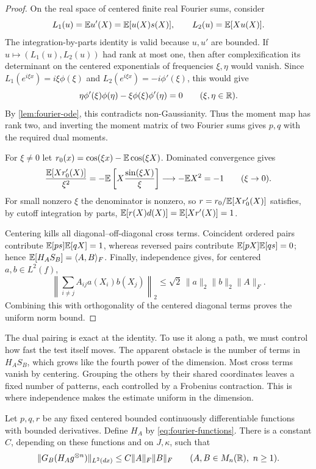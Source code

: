 \begin{proof}
On the real space of centered finite real Fourier sums, consider
\[
 L_1(u)=\mathbb E u'(X)=\mathbb E[u(X)s(X)],
 \qquad L_2(u)=\mathbb E[Xu(X)].
\]
The integration-by-parts identity is valid because $u,u'$ are bounded.  If
$u\mapsto(L_1(u),L_2(u))$ had rank at most one, then after complexification
its determinant on the centered exponentials of frequencies $\xi,\eta$
would vanish.  Since
$L_1(e^{i\xi x})=i\xi\phi(\xi)$ and
$L_2(e^{i\xi x})=-i\phi'(\xi)$, this would give
\[
 \eta\phi'(\xi)\phi(\eta)
       -\xi\phi(\xi)\phi'(\eta)=0
 \qquad(\xi,\eta\in\mathbb R).
\]
By \cref{lem:fourier-ode}, this contradicts non-Gaussianity.  Thus the moment
map has rank two, and inverting the moment matrix of two Fourier sums gives
$p,q$ with the required dual moments.

For $\xi\ne0$ let
$r_0(x)=\cos(\xi x)-\mathbb E\cos(\xi X)$.  Dominated convergence
gives
\[
 \frac{\mathbb E[Xr_0'(X)]}{\xi^2}
 =-\mathbb E\left[X\frac{\sin(\xi X)}\xi\right]
 \longrightarrow-\mathbb E X^2=-1
 \qquad(\xi\to0).
\]
For small nonzero $\xi$ the denominator is nonzero, so
$r=r_0/\mathbb E[Xr_0'(X)]$ satisfies, by cutoff integration by parts,
$\mathbb E[r(X)d(X)]=\mathbb E[Xr'(X)]=1$.

Centering kills all diagonal--off-diagonal cross terms.  Coincident ordered
pairs contribute $\mathbb E[ps]\mathbb E[qX]=1$, whereas reversed pairs contribute
$\mathbb E[pX]\mathbb E[qs]=0$; hence $\mathbb E[H_AS_B]=\langle A,B\rangle_F$.
Finally, independence gives, for centered $a,b\in L^2(f)$,
\begin{equation}
 \left\|\sum_{i\ne j}A_{ij}a(X_i)b(X_j)\right\|_2
 \le\sqrt2\,\|a\|_2\|b\|_2\|A\|_F.
\end{equation}
Combining this with orthogonality of the centered diagonal terms proves the
uniform norm bound.
\end{proof}

The dual pairing is exact at the identity. To use it along a path, we must
control how fast the test itself moves. The apparent obstacle is the number
of terms in \(H_AS_B\), which grows like the fourth power of the dimension.
Most cross terms vanish by centering. Grouping the others by their shared
coordinates leaves a fixed number of patterns, each controlled by a
Frobenius contraction. This is where independence makes the estimate
uniform in the dimension.

\begin{lemma}
\label{lem:fourier-generator-bound}
Let $p,q,r$ be any fixed centered bounded continuously differentiable
functions with bounded derivatives.  Define $H_A$ by
\eqref{eq:fourier-functions}.  There is a constant $C$,
depending on these functions and on $J,\kappa$, such that
\begin{equation}
 \|G_B(H_Ag^{\otimes n})\|_{L^2(dx)}
 \le C\|A\|_F\|B\|_F
 \qquad(A,B\in M_n(\mathbb R),\ n\ge1).
\end{equation}
\end{lemma}

